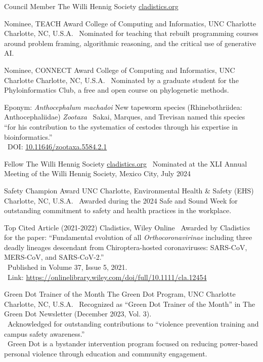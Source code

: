 \documentclass[11pt, letterpaper, sans]{moderncv}
\begin{document}
    {Council Member}
    {The Willi Hennig Society}
    {\href{https://cladistics.org/}{cladistics.org}}
    {}
    {}

    {Nominee, TEACH Award}
    {College of Computing and Informatics, UNC Charlotte}
    {Charlotte, NC, U.S.A.}
    {}
    {\textbullet~Nominated for teaching that rebuilt programming courses around problem framing, algorithmic reasoning, and the critical use of generative AI.}

    {Nominee, CONNECT Award}
    {College of Computing and Informatics, UNC Charlotte}
    {Charlotte, NC, U.S.A.}
    {}
    {\textbullet~Nominated by a graduate student for the Phyloinformatics Club, a free and open course on phylogenetic methods.}

    {Eponym: \textit{Anthocephalum machadoi}}
    {New tapeworm species (Rhinebothriidea: Anthocephaliidae)}
    {\textit{Zootaxa}}
    {}
    {\textbullet~Sakai, Marques, and Trevisan named this species ``for his contribution to the systematics of cestodes through his expertise in bioinformatics.''\\
    \textbullet~DOI: \href{https://doi.org/10.11646/zootaxa.5584.2.1}{10.11646/zootaxa.5584.2.1}}

    {Fellow}
    {The Willi Hennig Society}
    {\href{https://cladistics.org/}{cladistics.org}}
    {}
    {\textbullet~Nominated at the XLI Annual Meeting of the Willi Hennig Society, Mexico City, July 2024}

    {Safety Champion Award}
    {UNC Charlotte, Environmental Health \& Safety (EHS)}
    {Charlotte, NC, U.S.A.}
    {}
    {\textbullet~Awarded during the 2024 Safe and Sound Week for outstanding commitment to safety and health practices in the workplace.}

    {Top Cited Article (2021-2022)}
    {Cladistics, Wiley}
    {Online}
    {}
    {
        \textbullet~Awarded by Cladistics for the paper: ``Fundamental evolution of all \textit{Orthocoronavirinae} including three deadly lineages descendant from Chiroptera-hosted coronaviruses: SARS-CoV, MERS-CoV, and SARS-CoV-2.''\\
        \textbullet~Published in Volume 37, Issue 5, 2021.\\
        \textbullet~Link: \url{https://onlinelibrary.wiley.com/doi/full/10.1111/cla.12454}
    }

    {Green Dot Trainer of the Month}
    {The Green Dot Program, UNC Charlotte}
    {Charlotte, NC, U.S.A.}
    {}
    {
        \textbullet~Recognized as ``Green Dot Trainer of the Month'' in The Green Dot Newsletter (December 2023, Vol. 3).\\
        \textbullet~Acknowledged for outstanding contributions to ``violence prevention training and campus safety awareness.''\\
        \textbullet~Green Dot is a bystander intervention program focused on reducing power-based personal violence through education and community engagement.\\
    }
\end{document}
